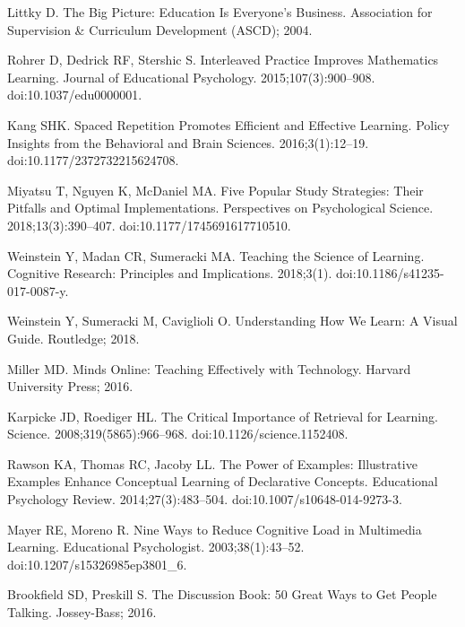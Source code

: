 \documentclass[10pt,letterpaper]{article}
\begin{document}
\begin{thebibliography}{10}
Littky D.
\newblock The Big Picture: Education Is Everyone's Business.
\newblock Association for Supervision \& Curriculum Development ({ASCD}); 2004.

Rohrer D, Dedrick RF, Stershic S.
\newblock Interleaved Practice Improves Mathematics Learning.
\newblock Journal of Educational Psychology. 2015;107(3):900--908.
\newblock doi:{10.1037/edu0000001}.

Kang SHK.
\newblock Spaced Repetition Promotes Efficient and Effective Learning.
\newblock Policy Insights from the Behavioral and Brain Sciences.
  2016;3(1):12--19.
\newblock doi:{10.1177/2372732215624708}.

Miyatsu T, Nguyen K, McDaniel MA.
\newblock Five Popular Study Strategies: Their Pitfalls and Optimal
  Implementations.
\newblock Perspectives on Psychological Science. 2018;13(3):390--407.
\newblock doi:{10.1177/1745691617710510}.

Weinstein Y, Madan CR, Sumeracki MA.
\newblock Teaching the Science of Learning.
\newblock Cognitive Research: Principles and Implications. 2018;3(1).
\newblock doi:{10.1186/s41235-017-0087-y}.

Weinstein Y, Sumeracki M, Caviglioli O.
\newblock Understanding How We Learn: A Visual Guide.
\newblock Routledge; 2018.

Miller MD.
\newblock Minds Online: Teaching Effectively with Technology.
\newblock Harvard University Press; 2016.

Karpicke JD, Roediger HL.
\newblock The Critical Importance of Retrieval for Learning.
\newblock Science. 2008;319(5865):966--968.
\newblock doi:{10.1126/science.1152408}.

Rawson KA, Thomas RC, Jacoby LL.
\newblock The Power of Examples: Illustrative Examples Enhance Conceptual
  Learning of Declarative Concepts.
\newblock Educational Psychology Review. 2014;27(3):483--504.
\newblock doi:{10.1007/s10648-014-9273-3}.

Mayer RE, Moreno R.
\newblock Nine Ways to Reduce Cognitive Load in Multimedia Learning.
\newblock Educational Psychologist. 2003;38(1):43--52.
\newblock doi:{10.1207/s15326985ep3801\_6}.

Brookfield SD, Preskill S.
\newblock The Discussion Book: 50 Great Ways to Get People Talking.
\newblock Jossey-Bass; 2016.


\end{thebibliography}
\end{document}
